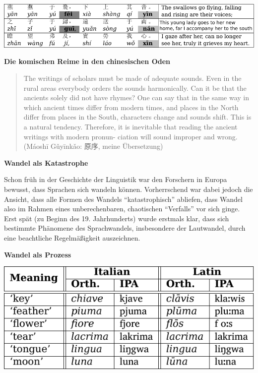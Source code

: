 \includegraphics[width=\textwidth]{img/odes.pdf}


\par\noindent\textbf{Die komischen Reime in den chinesischen Oden}

\begin{quote}
The writings of scholars must be made of adequate sounds. Even in the
rural areas everybody orders the sounds harmonically. Can it be that the
ancients solely did not have rhymes? One can say that in the same way in
which ancient times differ from modern times, and places in the North
differ from places in the South, characters change and sounds shift.
This is a natural tendency. Therefore, it is inevitable that reading the
ancient writings with modern pronun- ciation will sound improper and
wrong. (Máoshī Gǔyīnkǎo: 原序, meine Übersetzung)
\end{quote}

\par\noindent\textbf{Wandel als Katastrophe}

Schon früh in der Geschichte der Linguistik war den Forschern in Europa
bewusst, dass Sprachen sich wandeln können. Vorherrschend war dabei
jedoch die Ansicht, dass alle Formen des Wandels ``katastrophisch''
abliefen, dass Wandel also im Rahmen eines unberechenbaren, chaotischen
``Verfalls'' vor sich ginge. Erst spät (zu Beginn des 19. Jahrhunderts)
wurde erstmals klar, dass sich bestimmte Phänomene des Sprachwandels,
insbesondere der Lautwandel, durch eine beachtliche Regelmäßigkeit
auszeichnen.

\par\noindent\textbf{Wandel als Prozess}

\includegraphics[width=\textwidth]{img/lautwandel-ita-lat.pdf}



